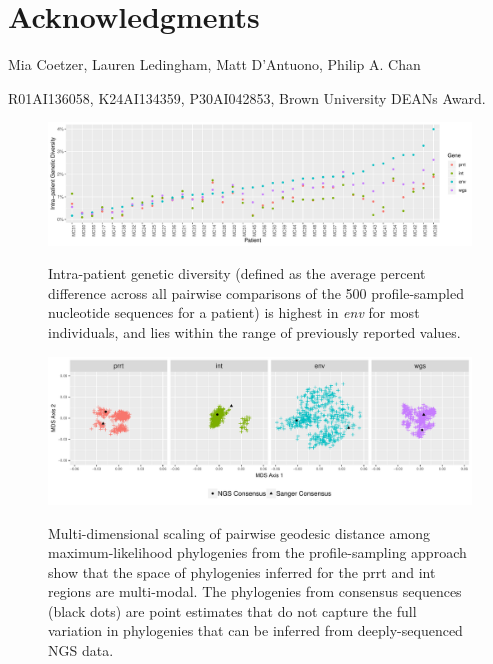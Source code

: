 \documentclass[letterpaper]{article}
\begin{document}
\section*{Acknowledgments}

Mia Coetzer, Lauren Ledingham, Matt D'Antuono, Philip A. Chan

R01AI136058, K24AI134359, P30AI042853, Brown University DEANs Award.

\printbibliography

\begin{figure}[p!]
	\caption{Intra-patient genetic diversity (defined as the average percent difference across all pairwise comparisons of the 500 profile-sampled nucleotide sequences for a patient) is highest in \emph{env} for most individuals, and lies within the range of previously reported values.}
	\centering
	\includegraphics[width=\linewidth]{Figure1}
	\label{fig1}
\end{figure}

\begin{figure}[p!]
	\caption{Multi-dimensional scaling of pairwise geodesic distance among maximum-likelihood phylogenies from the profile-sampling approach show that the space of phylogenies inferred for the prrt and int regions are multi-modal. The phylogenies from consensus sequences (black dots) are point estimates that do not capture the full variation in phylogenies that can be inferred from deeply-sequenced NGS data.}
	\centering
	\includegraphics[width=\linewidth]{Figure2}
	\label{fig2}
\end{figure}
	
\end{document}
